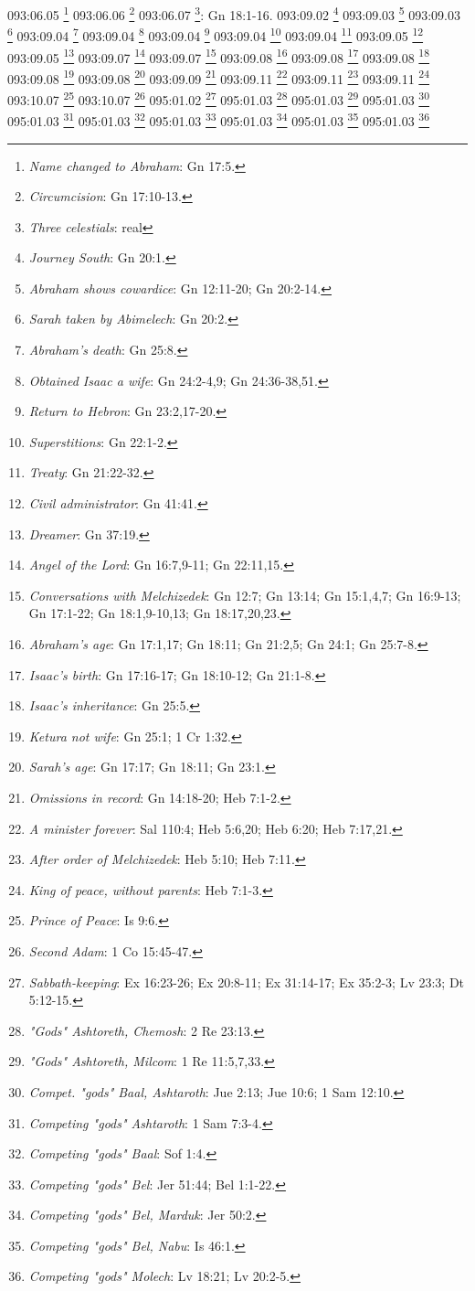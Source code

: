 {{{{{{{{{{{{{{{{{093:06.05 \footnote{\textit{Name changed to Abraham}: Gn 17:5.}
093:06.06 \footnote{\textit{Circumcision}: Gn 17:10-13.}
093:06.07 \footnote{\textit{Three celestials}: real}: Gn 18:1-16.}
093:09.02 \footnote{\textit{Journey South}: Gn 20:1.}
093:09.03 \footnote{\textit{Abraham shows cowardice}: Gn 12:11-20; Gn 20:2-14.}
093:09.03 \footnote{\textit{Sarah taken by Abimelech}: Gn 20:2.}
093:09.04 \footnote{\textit{Abraham's death}: Gn 25:8.}
093:09.04 \footnote{\textit{Obtained Isaac a wife}: Gn 24:2-4,9; Gn 24:36-38,51.}
093:09.04 \footnote{\textit{Return to Hebron}: Gn 23:2,17-20.}
093:09.04 \footnote{\textit{Superstitions}: Gn 22:1-2.}
093:09.04 \footnote{\textit{Treaty}: Gn 21:22-32.}
093:09.05 \footnote{\textit{Civil administrator}: Gn 41:41.}
093:09.05 \footnote{\textit{Dreamer}: Gn 37:19.}
093:09.07 \footnote{\textit{Angel of the Lord}: Gn 16:7,9-11; Gn 22:11,15.}
093:09.07 \footnote{\textit{Conversations with Melchizedek}: Gn 12:7; Gn 13:14; Gn 15:1,4,7; Gn 16:9-13; Gn 17:1-22; Gn 18:1,9-10,13; Gn 18:17,20,23.}
093:09.08 \footnote{\textit{Abraham's age}: Gn 17:1,17; Gn 18:11; Gn 21:2,5; Gn 24:1; Gn 25:7-8.}
093:09.08 \footnote{\textit{Isaac's birth}: Gn 17:16-17; Gn 18:10-12; Gn 21:1-8.}
093:09.08 \footnote{\textit{Isaac's inheritance}: Gn 25:5.}
093:09.08 \footnote{\textit{Ketura not wife}: Gn 25:1; 1 Cr 1:32.}
093:09.08 \footnote{\textit{Sarah's age}: Gn 17:17; Gn 18:11; Gn 23:1.}
093:09.09 \footnote{\textit{Omissions in record}: Gn 14:18-20; Heb 7:1-2.}
093:09.11 \footnote{\textit{A minister forever}: Sal 110:4; Heb 5:6,20; Heb 6:20; Heb 7:17,21.}
093:09.11 \footnote{\textit{After order of Melchizedek}: Heb 5:10; Heb 7:11.}
093:09.11 \footnote{\textit{King of peace, without parents}: Heb 7:1-3.}
093:10.07 \footnote{\textit{Prince of Peace}: Is 9:6.}
093:10.07 \footnote{\textit{Second Adam}: 1 Co 15:45-47.}
095:01.02 \footnote{\textit{Sabbath-keeping}: Ex 16:23-26; Ex 20:8-11; Ex 31:14-17; Ex 35:2-3; Lv 23:3; Dt 5:12-15.}
095:01.03 \footnote{\textit{"Gods" Ashtoreth, Chemosh}: 2 Re 23:13.}
095:01.03 \footnote{\textit{"Gods" Ashtoreth, Milcom}: 1 Re 11:5,7,33.}
095:01.03 \footnote{\textit{Compet. "gods" Baal, Ashtaroth}: Jue 2:13; Jue 10:6; 1 Sam 12:10.}
095:01.03 \footnote{\textit{Competing "gods" Ashtaroth}: 1 Sam 7:3-4.}
095:01.03 \footnote{\textit{Competing "gods" Baal}: Sof 1:4.}
095:01.03 \footnote{\textit{Competing "gods" Bel}: Jer 51:44; Bel 1:1-22.}
095:01.03 \footnote{\textit{Competing "gods" Bel, Marduk}: Jer 50:2.}
095:01.03 \footnote{\textit{Competing "gods" Bel, Nabu}: Is 46:1.}
095:01.03 \footnote{\textit{Competing "gods" Molech}: Lv 18:21; Lv 20:2-5.}
}}}}}}}}}}}}}}}}
